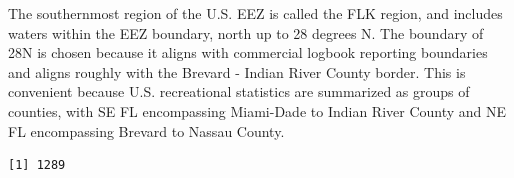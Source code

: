 \documentclass[
  letterpaper,
  oneside,
  open=any]{scrbook}
\newenvironment{Shaded}{\begin{snugshade}}{\end{snugshade}}
\newcommand{\AttributeTok}[1]{\textcolor[rgb]{0.40,0.45,0.13}{#1}}
\newcommand{\CommentTok}[1]{\textcolor[rgb]{0.37,0.37,0.37}{#1}}
\newcommand{\DecValTok}[1]{\textcolor[rgb]{0.68,0.00,0.00}{#1}}
\newcommand{\FloatTok}[1]{\textcolor[rgb]{0.68,0.00,0.00}{#1}}
\newcommand{\FunctionTok}[1]{\textcolor[rgb]{0.28,0.35,0.67}{#1}}
\newcommand{\NormalTok}[1]{\textcolor[rgb]{0.00,0.23,0.31}{#1}}
\newcommand{\OtherTok}[1]{\textcolor[rgb]{0.00,0.23,0.31}{#1}}
\newcommand{\SpecialCharTok}[1]{\textcolor[rgb]{0.37,0.37,0.37}{#1}}
\newcommand{\StringTok}[1]{\textcolor[rgb]{0.13,0.47,0.30}{#1}}
\begin{document}
The southernmost region of the U.S. EEZ is called the FLK region, and
includes waters within the EEZ boundary, north up to 28 degrees N. The
boundary of 28N is chosen because it aligns with commercial logbook
reporting boundaries and aligns roughly with the Brevard - Indian River
County border. This is convenient because U.S. recreational statistics
are summarized as groups of counties, with SE FL encompassing Miami-Dade
to Indian River County and NE FL encompassing Brevard to Nassau County.

\begin{Shaded}
\end{Shaded}

\begin{verbatim}
[1] 1289
\end{verbatim}

\begin{Shaded}
\end{Shaded}
\end{document}
